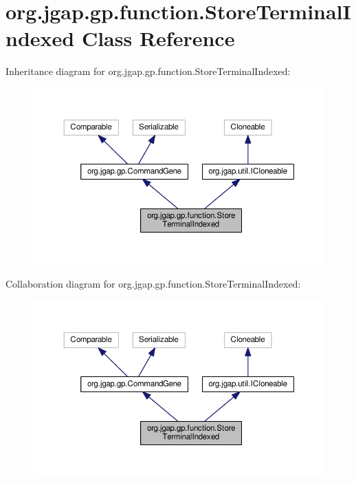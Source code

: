 \hypertarget{classorg_1_1jgap_1_1gp_1_1function_1_1_store_terminal_indexed}{\section{org.\-jgap.\-gp.\-function.\-Store\-Terminal\-Indexed Class Reference}
\label{classorg_1_1jgap_1_1gp_1_1function_1_1_store_terminal_indexed}
}


Inheritance diagram for org.\-jgap.\-gp.\-function.\-Store\-Terminal\-Indexed\-:
\nopagebreak
\begin{figure}[H]
\begin{center}
\leavevmode
\includegraphics[width=350pt]{classorg_1_1jgap_1_1gp_1_1function_1_1_store_terminal_indexed__inherit__graph}
\end{center}
\end{figure}


Collaboration diagram for org.\-jgap.\-gp.\-function.\-Store\-Terminal\-Indexed\-:
\nopagebreak
\begin{figure}[H]
\begin{center}
\leavevmode
\includegraphics[width=350pt]{classorg_1_1jgap_1_1gp_1_1function_1_1_store_terminal_indexed__coll__graph}
\end{center}
\end{figure}
